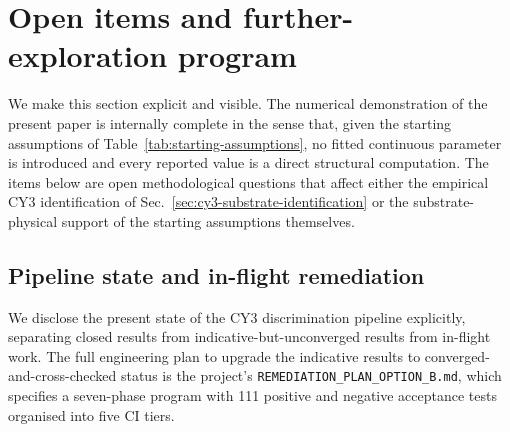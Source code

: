 ﻿\documentclass[reprint,amsmath,amssymb,aps,prd,longbibliography,floatfix]{revtex4-2}
\begin{document}
\section{Open items and further-exploration program}
\label{sec:open-items}

We make this section explicit and visible. The numerical demonstration
of the present paper is internally complete in the sense that, given
the starting assumptions of Table~\ref{tab:starting-assumptions}, no
fitted continuous parameter is introduced and every reported value is
a direct structural computation. The items below are open methodological
questions that affect either the empirical CY3 identification of
Sec.~\ref{sec:cy3-substrate-identification} or the substrate-physical
support of the starting assumptions themselves.

\subsection{Pipeline state and in-flight remediation}
\label{subsec:pipeline-state}

We disclose the present state of the CY3 discrimination pipeline
explicitly, separating closed results from indicative-but-unconverged
results from in-flight work. The full engineering plan to upgrade the
indicative results to converged-and-cross-checked status is the
project's \texttt{REMEDIATION\_PLAN\_OPTION\_B.md},
which specifies a seven-phase program with 111 positive and negative
acceptance tests organised into five CI tiers.
\end{document}
